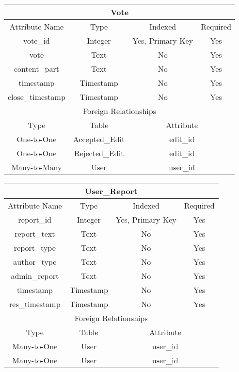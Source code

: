 \documentclass[12pt,letterpaper]{article}
\begin{document}
\vspace*{.5cm}
\begin{center}
\label{Vote}
\begin{tabular}{|c|c|c|c|}
\hline
\multicolumn{4}{|c|}{Vote} \\ \hline
Attribute Name & Type & Indexed & Required \\ \hline
vote\_id & Integer & Yes, Primary Key & Yes \\ \hline
vote & Text & No & Yes \\ \hline	%
content\_part & Text & No & Yes \\ \hline %
timestamp & Timestamp & No & Yes \\ \hline
close\_timestamp & Timestamp & No & Yes \\ \hline	%
\multicolumn{4}{|c|}{Foreign Relationships} \\ \hline
Type & Table & \multicolumn{2}{c|}{Attribute} \\ \hline
One-to-One & Accepted\_Edit & \multicolumn{2}{c|}{edit\_id} \\ \hline %
One-to-One & Rejected\_Edit & \multicolumn{2}{c|}{edit\_id} \\ \hline %
Many-to-Many & User & \multicolumn{2}{c|}{user\_id} \\ \hline %
\end{tabular}
\end{center}


\begin{center}
\label{UserReport}
\begin{tabular}{|c|c|c|c|}
\hline
\multicolumn{4}{|c|}{User\_Report} \\ \hline
Attribute Name & Type & Indexed & Required \\ \hline
report\_id & Integer & Yes, Primary Key & Yes \\ \hline
report\_text & Text & No & Yes \\ \hline
report\_type & Text & No & Yes \\ \hline %
author\_type & Text & No & Yes \\ \hline %
admin\_report & Text & No & Yes \\ \hline
timestamp & Timestamp & No & Yes \\ \hline
res\_timestamp & Timestamp & No & Yes \\ \hline
\multicolumn{4}{|c|}{Foreign Relationships} \\ \hline
Type & Table & \multicolumn{2}{c|}{Attribute} \\ \hline
Many-to-One & User & \multicolumn{2}{c|}{user\_id} \\ \hline %
Many-to-One & User & \multicolumn{2}{c|}{user\_id} \\ \hline %
\end{tabular}
\end{center}
\end{document}
